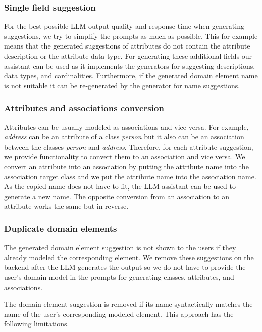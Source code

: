 \subsubsection{Single field suggestion}

For the best possible LLM output quality and response time when generating suggestions, we try to simplify the prompts as much as possible. This for example means that the generated suggestions of attributes do not contain the attribute description or the attribute data type. For generating these additional fields our assistant can be used as it implements the generators for suggesting descriptions, data types, and cardinalities. Furthermore, if the generated domain element name is not suitable it can be re-generated by the generator for name suggestions.


\subsubsection{Attributes and associations conversion}
\label{sec:attributes_and_associations_conversion}
Attributes can be usually modeled as associations and vice versa. For example, \textit{address} can be an attribute of a class \textit{person} but it also can be an association between the classes \textit{person} and \textit{address}. Therefore, for each attribute suggestion, we provide functionality to convert them to an association and vice versa. We convert an attribute into an association by putting the attribute name into the association target class and we put the attribute name into the association name. As the copied name does not have to fit, the LLM assistant can be used to generate a new name. The opposite conversion from an association to an attribute works the same but in reverse.


\subsubsection{Duplicate domain elements}
\label{duplicate_domain_elements}

The generated domain element suggestion is not shown to the users if they already modeled the corresponding element. We remove these suggestions on the backend after the LLM generates the output so we do not have to provide the user's domain model in the prompts for generating classes, attributes, and associations.

The domain element suggestion is removed if its name syntactically matches the name of the user's corresponding modeled element. This approach has the following limitations.

